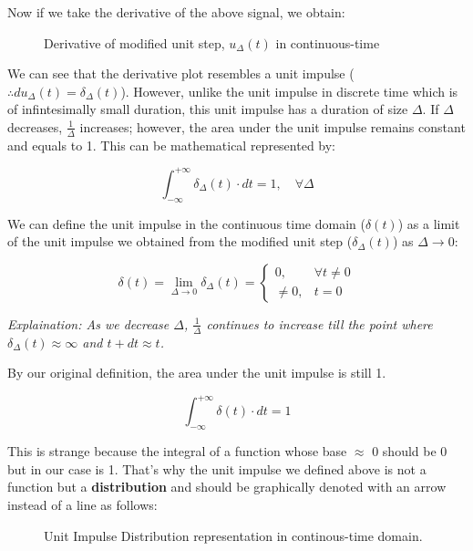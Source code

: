 \documentclass[letterpaper,12pt]{article}
\begin{document}
Now if we take the derivative of the above signal, we obtain:
\begin{figure}[!ht]
    \centering
    
    \caption{Derivative of modified unit step, $u_{\Delta}(t)$ in continuous-time}\label{fig:derivative_unit_step_cont}
\end{figure}

We can see that the derivative plot resembles a unit impulse ($\therefore du_{\Delta}(t) = \delta_{\Delta}(t)$). However, unlike the unit impulse in discrete time which is of infintesimally small duration, this unit impulse has a duration of size $\Delta$. If $\Delta$ decreases, $\frac{1}{\Delta}$ increases; however, the area under the unit impulse remains constant and equals to 1. This can be mathematical represented by:

\[\int_{-\infty}^{+\infty}\delta_{\Delta}(t)\cdot dt = 1, \quad \forall \Delta\]

We can define the unit impulse in the continuous time domain ($\delta(t)$) as a limit of the unit impulse we obtained from the modified unit step ($\delta_{\Delta}(t)$) as $\Delta \to 0$:

\[\delta(t) = \lim_{\Delta \to 0} \delta_{\Delta}(t) = \begin{cases}
        0,      & \forall t \neq 0 \\
        \neq 0, & t = 0
    \end{cases}\]

\textit{Explaination: As we decrease $\Delta$, $\frac{1}{\Delta}$ continues to increase till the point where $\delta_{\Delta}(t) \approx \infty$ and $t + dt \approx t$.}

By our original definition, the area under the unit impulse is still 1.

\[\int_{-\infty}^{+\infty}\delta(t)\cdot dt = 1\]

This is strange because the integral of a function whose base $\approx$ 0 should be 0 but in our case is 1. That's why the unit impulse we defined above is not a function but a \textbf{distribution} and should be graphically denoted with an arrow instead of a line as follows:

\begin{figure}[!ht]
    \centering
    
    \caption{Unit Impulse Distribution representation in continous-time domain.}\label{fig:unit_step_distribution}
\end{figure}
\end{document}

